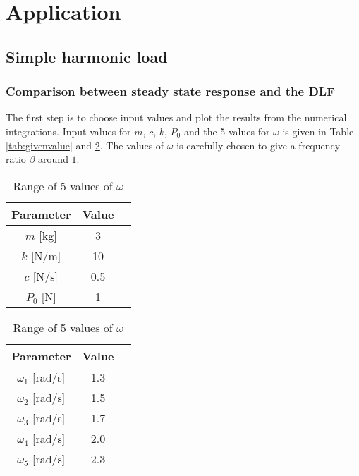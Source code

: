 \documentclass[11pt, a4paper, english, hidelinks]{NTNUoving}
\begin{document}
\section{Application}
\subsection{Simple harmonic load}
\subsubsection*{Comparison between steady state response and the DLF}
The first step is to choose input values and plot the results from the numerical integrations. Input values for $m$, $c$, $k$, $P_0$ and the 5 values for $\omega$ is given in Table \ref{tab:givenvalue} and \ref{tab:omegarange}. The values of $\omega$ is carefully chosen to give a frequency ratio $\beta$ around $1$.
\begin{table}
	\parbox{.45\linewidth}{
		\centering
		\begin{tabular}{ccc}
			\toprule
			Parameter & Value\\
			\midrule
			$m$ [kg] & 3 \\
			\midrule
			$k$ [N/m] & 10 \\
			\midrule
			$c$ [N/s] & 0.5 \\
			\midrule 
			$P_0$ [N] & 1 \\
			\bottomrule
		\end{tabular}
		\caption{Given values}
		\label{tab:givenvalue}
	}
	\hfill
	\parbox{.45\linewidth}{
		\centering
		\begin{tabular}{ccc}
			\toprule
			Parameter & Value\\
			\midrule
			$\omega_1$ [rad/s] & 1.3 \\
			\midrule
			$\omega_2$ [rad/s] & 1.5 \\
			\midrule
			$\omega_3$ [rad/s] & 1.7 \\
			\midrule 
			$\omega_4$ [rad/s] & 2.0 \\
			\midrule
			$\omega_5$ [rad/s] & 2.3 \\
			\bottomrule
		\end{tabular}
		\caption{Range of 5 values of $\omega$}
		\label{tab:omegarange}
	}
\end{table}
\end{document}

